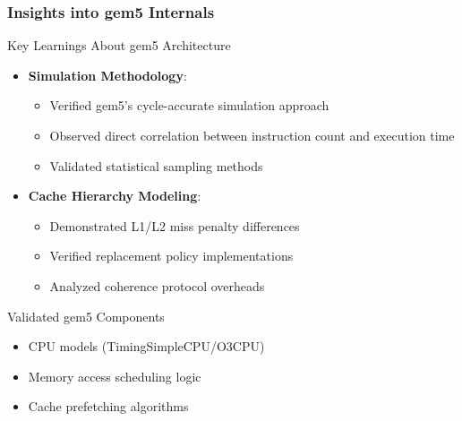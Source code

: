 \begin{frame}[fragile]
  \frametitle{Insights into gem5 Internals}
  
  \begin{block}{Key Learnings About gem5 Architecture}
  \begin{itemize}
      \item \textbf{Simulation Methodology}:
      \begin{itemize}
          \item Verified gem5's cycle-accurate simulation approach
          \item Observed direct correlation between instruction count and execution time
          \item Validated statistical sampling methods
      \end{itemize}
      
      \item \textbf{Cache Hierarchy Modeling}:
      \begin{itemize}
          \item Demonstrated L1/L2 miss penalty differences
          \item Verified replacement policy implementations
          \item Analyzed coherence protocol overheads
      \end{itemize}
  \end{itemize}
  \end{block}
  
  \begin{exampleblock}{Validated gem5 Components}
  \begin{itemize}
      \item CPU models (TimingSimpleCPU/O3CPU)
      \item Memory access scheduling logic
      \item Cache prefetching algorithms
  \end{itemize}
  \end{exampleblock}
  \end{frame}
  
